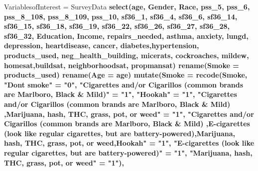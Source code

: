 \documentclass[]{article}
\newenvironment{Shaded}{\begin{snugshade}}{\end{snugshade}}
\newcommand{\DataTypeTok}[1]{\textcolor[rgb]{0.13,0.29,0.53}{#1}}
\newcommand{\DecValTok}[1]{\textcolor[rgb]{0.00,0.00,0.81}{#1}}
\newcommand{\KeywordTok}[1]{\textcolor[rgb]{0.13,0.29,0.53}{\textbf{#1}}}
\newcommand{\NormalTok}[1]{#1}
\newcommand{\OperatorTok}[1]{\textcolor[rgb]{0.81,0.36,0.00}{\textbf{#1}}}
\newcommand{\StringTok}[1]{\textcolor[rgb]{0.31,0.60,0.02}{#1}}
\begin{document}
\begin{Shaded}
\begin{Highlighting}[]
\NormalTok{VariablesofInterest =}\StringTok{ }
\StringTok{  }\NormalTok{SurveyData }\OperatorTok{%>%}\StringTok{ }
\StringTok{  }\KeywordTok{select}\NormalTok{(age, Gender, Race, pss_}\DecValTok{5}\NormalTok{, pss_}\DecValTok{6}\NormalTok{, pss_}\DecValTok{8}\NormalTok{_}\DecValTok{108}\NormalTok{, pss_}\DecValTok{8}\NormalTok{_}\DecValTok{109}\NormalTok{, pss_}\DecValTok{10}\NormalTok{, sf36_}\DecValTok{1}\NormalTok{, sf36_}\DecValTok{4}\NormalTok{, }
\NormalTok{        sf36_}\DecValTok{6}\NormalTok{, sf36_}\DecValTok{14}\NormalTok{, sf36_}\DecValTok{15}\NormalTok{, sf36_}\DecValTok{18}\NormalTok{, sf36_}\DecValTok{19}\NormalTok{, sf36_}\DecValTok{22}\NormalTok{, sf36_}\DecValTok{26}\NormalTok{, sf36_}\DecValTok{27}\NormalTok{, sf36_}\DecValTok{28}\NormalTok{,}
\NormalTok{        sf36_}\DecValTok{32}\NormalTok{, Education, Income, repairs_needed, asthma, anxiety, lungd, depression,}
\NormalTok{        heartdisease, cancer, diabetes,hypertension, products_used, neg_health_building, }
\NormalTok{        micerats, cockroaches, mildew, homesat,buildsat, neighborhoodsat, propmansat) }\OperatorTok{%>%}\StringTok{ }
\StringTok{  }
\StringTok{  }\KeywordTok{rename}\NormalTok{(}\DataTypeTok{Smoke =}\NormalTok{ products_used) }\OperatorTok{%>%}\StringTok{ }
\StringTok{  }\KeywordTok{rename}\NormalTok{(}\DataTypeTok{Age =}\NormalTok{ age) }\OperatorTok{%>%}\StringTok{ }
\StringTok{  }\KeywordTok{mutate}\NormalTok{(}\DataTypeTok{Smoke =} \KeywordTok{recode}\NormalTok{(Smoke, }
                    \StringTok{"Dont smoke"}\NormalTok{ =}\StringTok{ "0"}\NormalTok{,}
                    \StringTok{"Cigarettes and/or Cigarillos (common brands are Marlboro, Black & Mild)"}\NormalTok{ =}\StringTok{ "1"}\NormalTok{,}
                    \StringTok{"Hookah"}\NormalTok{ =}\StringTok{ "1"}\NormalTok{,}
                    \StringTok{"Cigarettes and/or Cigarillos (common brands are Marlboro, Black & Mild) ,Marijuana, hash, THC, grass, pot, or weed"}\NormalTok{ =}\StringTok{ "1"}\NormalTok{,}
                    \StringTok{"Cigarettes and/or Cigarillos (common brands are Marlboro, Black & Mild) ,E-cigarettes (look like regular cigarettes, but are battery-powered),Marijuana, hash, THC, grass, pot, or weed,Hookah"}\NormalTok{ =}\StringTok{ "1"}\NormalTok{,}
                    \StringTok{"E-cigarettes (look like regular cigarettes, but are battery-powered)"}\NormalTok{ =}\StringTok{ "1"}\NormalTok{,}
                   \StringTok{"Marijuana, hash, THC, grass, pot, or weed"}\NormalTok{ =}\StringTok{ "1"}\NormalTok{),}
}}}}
\end{Highlighting}
\end{Shaded}
\end{document}

